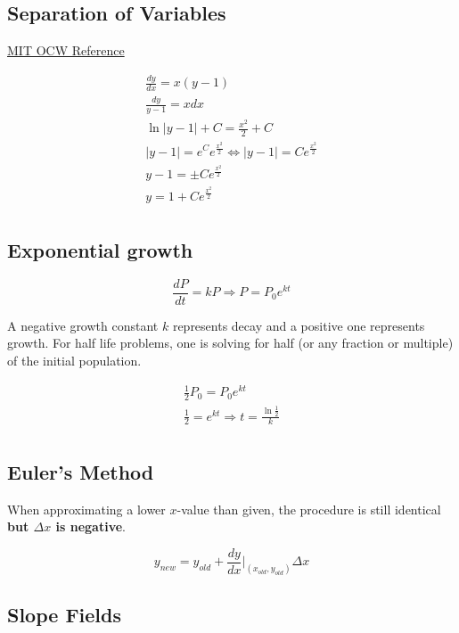 \subsection{Separation of Variables}\label{subsec:separation-of-variables}

\href{https://ocw.mit.edu/courses/mathematics/18-03sc-differential-equations-fall-2011/unit-i-first-order-differential-equations/basic-de-and-separable-equations/MIT18_03SCF11_s1_2text.pdf}{MIT OCW Reference}

\begin{gather*}
    \frac{dy}{dx}=x(y-1)\\
    \frac{dy}{y-1}=xdx\\
    \ln{|y-1|}+C=\frac{x^2}{2}+C\\
    |y-1|=e^Ce^{\frac{x^2}{2}} \Leftrightarrow |y-1|=Ce^{\frac{x^2}{2}}\\
    y-1=\pm Ce^{\frac{x^2}{2}}\\
    y=1+Ce^{\frac{x^2}{2}}\\
\end{gather*}

\subsection{Exponential growth}\label{subsec:exponential-growth}

\[\frac{dP}{dt}=kP \Rightarrow P=P_0e^{kt}\]

A negative growth constant $k$ represents decay and a positive one represents growth.
For half life problems, one is solving for half (or any fraction or multiple) of the initial population.

\begin{gather*}
    \frac{1}{2}P_0=P_0e^{kt}\\
    \frac{1}{2}=e^{kt} \Rightarrow t=\frac{\ln{\frac{1}{2}}}{k}\\
\end{gather*}

\subsection{Euler's Method}\label{subsec:euler's-method}

When approximating a lower $x$-value than given, the procedure is still identical \textbf{but $\Delta{x}$ is negative}.

\[y_{new}=y_{old}+\frac{dy}{dx}|_{(x_{old},y_{old})}\Delta{x}\]

\subsection{Slope Fields}\label{subsec:slope-fields}

